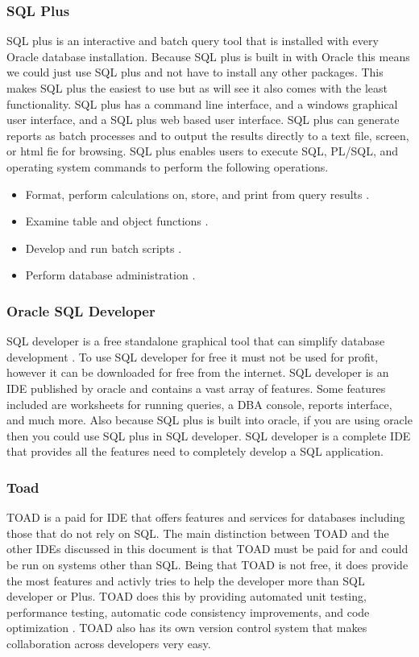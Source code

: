 \documentclass[draftclsnofoot, onecolumn, compsoc, 10pt]{IEEEtran}
\begin{document}
\subsubsection{SQL Plus}
SQL plus is an interactive and batch query tool that is installed with every Oracle database installation. 
Because SQL plus is built in with Oracle this means we could just use SQL plus and not have to install any other packages.
This makes SQL plus the easiest to use but as will see it also comes with the least functionality. 
SQL plus has a command line interface, and a windows graphical user interface, and a SQL plus web based user interface. 
SQL plus can generate reports as batch processes and to output the results directly to a text file, screen, or html fie for browsing.
SQL plus enables users to execute SQL, PL/SQL, and operating system commands to perform the following operations.
\begin{itemize}
	\item Format, perform calculations on, store, and print from query results \cite{SQL Plus Users Guide and Reference}.
	\item Examine table and object functions \cite{SQL Plus Users Guide and Reference}.
	\item Develop and run batch scripts \cite{SQL Plus Users Guide and Reference}.
	\item Perform database administration \cite{SQL Plus Users Guide and Reference}.
\end{itemize}

\subsubsection{Oracle SQL Developer}
SQL developer is a free standalone graphical tool that can simplify database development \cite{SQL Developer Documentation and Release 4.1}.
To use SQL developer for free it must not be used for profit, however it can be downloaded for free from the internet.
SQL developer is an IDE published by oracle and contains a vast array of features.
Some features included are worksheets for running queries, a DBA console, reports interface, and much more.
Also because SQL plus is built into oracle, if you are using oracle then you could use SQL plus in SQL developer. 
SQL developer is a complete IDE that provides all the features need to completely develop a SQL application.
 
\subsubsection{Toad}
TOAD is a paid for IDE that offers features and services for databases including those that do not rely on SQL.
The main distinction between TOAD and the other IDEs discussed in this document is that TOAD must be paid for and could be run on systems other than SQL.
Being that TOAD is not free, it does provide the most features and activly tries to help the developer more than SQL developer or Plus.
TOAD does this by providing automated unit testing, performance testing, automatic code consistency improvements, and code optimization \cite{Toad For Oracle}.
TOAD also has its own version control system that makes collaboration across developers very easy.
\end{document}
